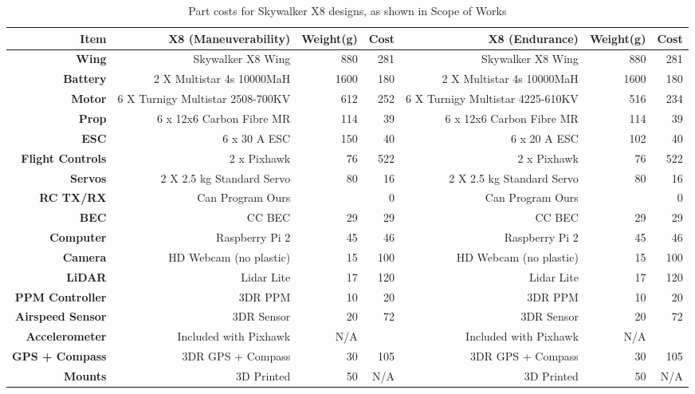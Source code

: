 \begin{landscape}
\begin{table}[!htbp]
	\centering
	\caption{Part costs for Skywalker X8 designs, as shown in Scope of Works}
	\begin{tabular}{|r|r|r|r|r|r|r|}
		\hline 
		\textbf{Item} & \textbf{X8 (Maneuverability)} & \textbf{Weight(g)} & \textbf{Cost} & \textbf{X8 (Endurance)} & \textbf{Weight(g)} & \textbf{Cost}\\
		\hline
		\textbf{Wing} & Skywalker X8 Wing & 880 & 281 & Skywalker X8 Wing & 880 & 281\\
		\hline
		\textbf{Battery} & 2 X Multistar 4s 10000MaH & 1600 & 180 & 2 X Multistar 4s 10000MaH & 1600 & 180\\
		\hline
		\textbf{Motor} & 6 X Turnigy Multistar 2508-700KV & 612 & 252 & 6 X Turnigy Multistar 4225-610KV & 516 & 234\\
		\hline
		\textbf{Prop} & 6 x 12x6 Carbon Fibre MR & 114 & 39 & 6 x 12x6 Carbon Fibre MR & 114 & 39\\
		\hline
		\textbf{ESC} & 6 x 30 A ESC & 150 & 40 & 6 x 20 A ESC & 102 & 40\\
		\hline
		\textbf{Flight Controls} & 2 x Pixhawk & 76 & 522 & 2 x Pixhawk & 76 & 522\\
		\hline
		\textbf{Servos} & 2 X 2.5 kg Standard Servo & 80 & 16 & 2 X 2.5 kg Standard Servo & 80 & 16\\
		\hline
		\textbf{RC TX/RX} & Can Program Ours & & 0 & Can Program Ours & & 0\\
		\hline
		\textbf{BEC} & CC BEC & 29 & 29 & CC BEC & 29 & 29\\
		\hline
		\textbf{Computer} & Raspberry Pi 2 & 45 & 46 & Raspberry Pi 2 & 45 & 46\\
		\hline
		\textbf{Camera} & HD Webcam (no plastic) & 15 & 100 & HD Webcam (no plastic) & 15 & 100\\
		\hline
		\textbf{LiDAR} & Lidar Lite & 17 & 120 & Lidar Lite & 17 & 120\\
		\hline
		\textbf{PPM Controller} & 3DR PPM  & 10 & 20 & 3DR PPM & 10 & 20\\
		\hline
		\textbf{Airspeed Sensor} & 3DR Sensor & 20 & 72 & 3DR Sensor & 20 & 72\\
		\hline
		\textbf{Accelerometer} & Included with Pixhawk & N/A & & Included with Pixhawk & N/A & \\
		\hline
		\textbf{GPS + Compass} & 3DR GPS + Compass & 30 & 105 & 3DR GPS + Compass & 30 & 105\\
		\hline
		\textbf{Mounts} & 3D Printed & 50 & N/A & 3D Printed & 50 & N/A\\

\end{tabular}
\end{table}
\end{landscape}
